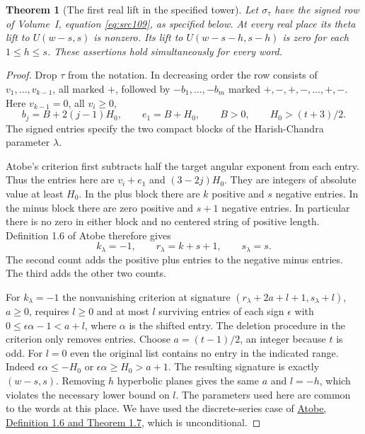 \documentclass[a4paper,11pt]{article}
\newtheorem{theorem}[proposition]{Theorem}
\theoremstyle{definition}
\theoremstyle{remark}
\numberwithin{equation}{section}
\begin{document}
\begin{theorem}[The first real lift in the specified tower]
\leavevmode\label{thm:occ167}
Let \(\sigma_\tau\) have the signed row of Volume~I, equation
\textup{\eqref{eq:src109}}, as specified below. At every real
place its theta lift to \(U(w-s,s)\) is nonzero. Its lift to
\(U(w-s-h,s-h)\) is zero for each \(1\le h\le s\).
These assertions hold simultaneously for every word.
\end{theorem}
\begin{proof}
Drop \(\tau\) from the notation. In decreasing order the row
consists of \(v_1,\ldots,v_{k-1}\), all marked \(+\), followed
by \(-b_1,\ldots,-b_m\) marked \(+,-,+,-,\ldots,+,-\).
Here \(v_{k-1}=0\), all \(v_i\ge0\),
\[
 b_j=B+2(j-1)H_0,\qquad e_1=B+H_0,\qquad B>0,\qquad
 H_0>(t+3)/2 .
\]
The signed entries specify the two compact blocks of the
Harish-Chandra parameter \(\lambda\).

Atobe's criterion first subtracts half the target angular
exponent from each entry. Thus the entries here are
\(v_i+e_1\) and \((3-2j)H_0\). They are integers of absolute
value at least \(H_0\). In the plus block there are \(k\)
positive and \(s\) negative entries. In the minus block
there are zero positive and \(s+1\) negative entries.
In particular there is no zero in either block and no
centered string of positive length. Definition 1.6 of Atobe
therefore gives
\[
     k_\lambda=-1,\qquad r_\lambda=k+s+1,\qquad s_\lambda=s .
\]
The second count adds the positive plus entries to the negative
minus entries. The third adds the other two counts.

For \(k_\lambda=-1\) the nonvanishing criterion at signature
\((r_\lambda+2a+l+1,s_\lambda+l)\), \(a\ge0\), requires
\(l\ge0\) and at most \(l\) surviving entries of each sign
\(\epsilon\) with \(0\le\epsilon\alpha-1<a+l\), where
\(\alpha\) is the shifted entry. The deletion procedure in the
criterion only removes entries. Choose \(a=(t-1)/2\), an
integer because \(t\) is odd. For \(l=0\) even the original
list contains no entry in the indicated range. Indeed
\(\epsilon\alpha\le-H_0\) or \(\epsilon\alpha\ge H_0>a+1\).
The resulting signature is exactly \((w-s,s)\).
Removing \(h\) hyperbolic planes gives the same \(a\) and
\(l=-h\), which violates the necessary lower bound on \(l\).
The parameters used here are common to the words at this
place. We have used the discrete-series case of
\href{https://arxiv.org/pdf/1610.07794}{Atobe, Definition 1.6
and Theorem 1.7}, which is unconditional.
\end{proof}
\end{document}
